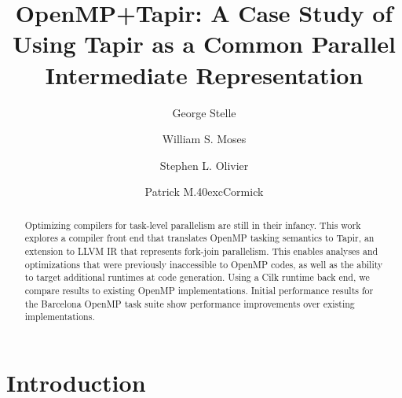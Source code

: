 \documentclass[sigconf]{acmart}
\newcommand{\McCormick} {M\raise .40ex\hbox{c}Cormick}
\begin{document}

\title{OpenMP+Tapir: A Case Study of Using Tapir as a Common Parallel Intermediate Representation}

\author{George Stelle}

\author{William S. Moses}

\author{Stephen L. Olivier}

\author{Patrick \McCormick}

\renewcommand{\shortauthors}{G. Stelle et al.}

\begin{abstract}
Optimizing compilers for task-level parallelism are still in their infancy.
This work explores a compiler front end that translates OpenMP tasking
semantics to Tapir, an extension to LLVM IR that represents fork-join
parallelism. This enables analyses and optimizations that were previously
inaccessible to OpenMP codes, as well as the ability to target additional
runtimes at code generation. Using a Cilk runtime back end, we compare results
to existing OpenMP implementations.  Initial performance results for the
Barcelona OpenMP task suite show performance improvements over existing
implementations.
\end{abstract}

\maketitle

\section{Introduction} \label{Sec:Introduction}
\end{document}
